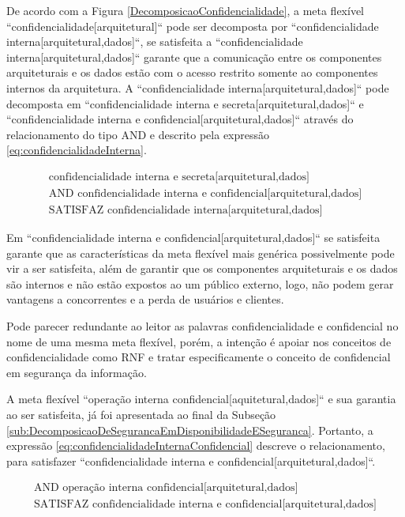 De acordo com a Figura \ref{DecomposicaoConfidencialidade}, a meta flexível ``confidencialidade[arquitetural]`` pode ser decomposta por ``confidencialidade interna[arquitetural,dados]``, se satisfeita a ``confidencialidade interna[arquitetural,dados]`` garante que a comunicação entre os componentes arquiteturais e os dados estão com o acesso restrito somente ao componentes internos da arquitetura. A ``confidencialidade interna[arquitetural,dados]`` pode decomposta em ``confidencialidade interna e secreta[arquitetural,dados]`` e ``confidencialidade interna e confidencial[arquitetural,dados]`` através do relacionamento do tipo AND e descrito pela expressão \ref{eq:confidencialidadeInterna}.   

\begin{eqnarray}
\label{eq:confidencialidadeInterna}
\textrm{confidencialidade interna e secreta[arquitetural,dados]}  \nonumber\\
\textrm{AND confidencialidade interna e confidencial[arquitetural,dados]} \nonumber\\
\textrm{SATISFAZ confidencialidade interna[arquitetural,dados]}
\end{eqnarray}

Em ``confidencialidade interna e confidencial[arquitetural,dados]`` se satisfeita garante que as características da meta flexível mais genérica possivelmente pode vir a ser satisfeita, além de garantir que os componentes arquiteturais e os dados são internos e não estão expostos ao um público externo, logo, não podem gerar vantagens a concorrentes e a perda de usuários e clientes. 

Pode parecer redundante ao leitor as palavras confidencialidade e confidencial no nome de uma mesma meta flexível, porém, a intenção é apoiar nos conceitos de confidencialidade como RNF e tratar especificamente o conceito de confidencial em segurança da informação. 

A meta flexível ``operação interna confidencial[aquitetural,dados]`` e sua garantia ao ser satisfeita, já foi apresentada ao final da Subseção \ref{sub:DecomposicaoDeSegurancaEmDisponibilidadeESeguranca}. Portanto, a expressão \ref{eq:confidencialidadeInternaConfidencial} descreve o relacionamento, para satisfazer ``confidencialidade interna e confidencial[arquitetural,dados]``.

\begin{eqnarray}
\label{eq:confidencialidadeInternaConfidencial}
\textrm{AND operação interna confidencial[arquitetural,dados]} \nonumber\\
\textrm{SATISFAZ confidencialidade interna e confidencial[arquitetural,dados]}
\end{eqnarray}  

